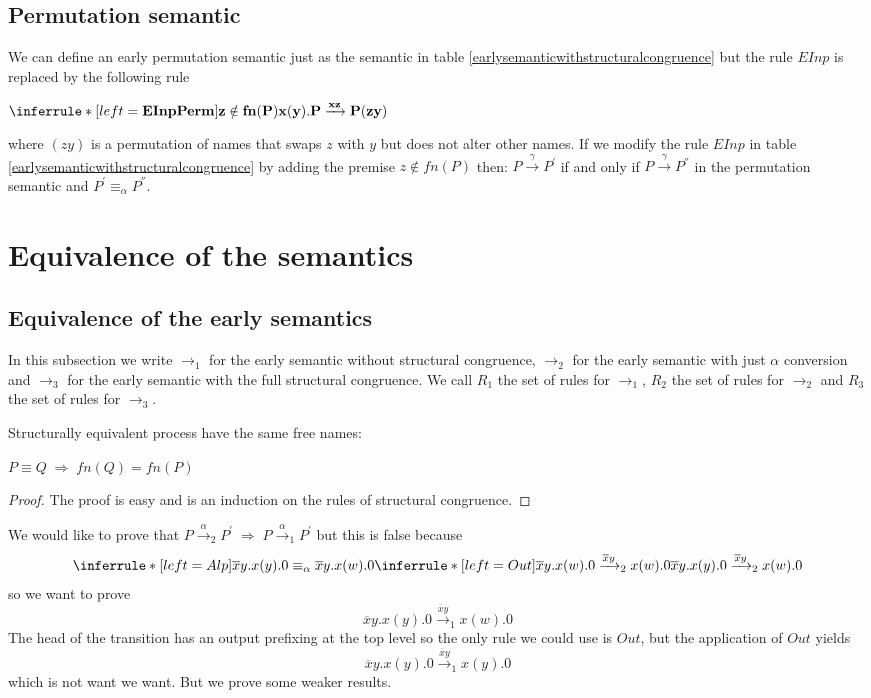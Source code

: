 \subsection{Permutation semantic}
We can define an early permutation semantic just as the semantic in table \ref{earlysemanticwithstructuralcongruence} but the rule $EInp$ is replaced by the following rule
\begin{center}
  $\inferrule* [left=\bf{EInpPerm}]{
    z\notin fn(P)
  }{
    x(y).P \xrightarrow{xz} P(zy)
  }$
\end{center}
where $(zy)$ is a permutation of names that swaps $z$ with $y$ but does not alter other names. If we modify the rule $EInp$ in table \ref{earlysemanticwithstructuralcongruence} by adding the premise $z\notin fn(P)$ then: $P\xrightarrow{\gamma}P^{'}$ if and only if $P\xrightarrow{\gamma}P^{''}$ in the permutation semantic and $P^{'}\equiv_{\alpha}P^{''}$.

\section{Equivalence of the semantics}
\subsection{Equivalence of the early semantics}\label{equivalenceOfEarlySemantics}
In this subsection we write $\rightarrow_{1}$ for the early semantic without structural congruence, $\rightarrow_{2}$ for the early semantic with just $\alpha$ conversion and $\rightarrow_{3}$ for the early semantic with the full structural congruence. We call $R_{1}$ the set of rules for $\rightarrow_{1}$, $R_{2}$ the set of rules for $\rightarrow_{2}$ and $R_{3}$ the set of rules for $\rightarrow_{3}$. 


\begin{lemma}
  Structurally equivalent process have the same free names:
  \begin{center}
    $P\equiv Q\; \Rightarrow\; fn(Q)= fn(P)$
  \end{center}
  \begin{proof}
    The proof is easy and is an induction on the rules of structural congruence.
  \end{proof}
\end{lemma}

We would like to prove that $P\xrightarrow{\alpha}_{2}P^{'}\; \Rightarrow\; P\xrightarrow{\alpha}_{1}P^{'}$ but this is false because
\[
  \inferrule* [left=Alp]{
      \overline{x}y.x(y).0 \equiv_{\alpha} \overline{x}y.x(w).0
    \\
      \inferrule* [left=Out]{
      }{
	\overline{x}y.x(w).0\xrightarrow{\overline{x}y}_{2}x(w).0
      }
  }{
    \overline{x}y.x(y).0\xrightarrow{\overline{x}y}_{2}x(w).0
  }
\]
so we want to prove 
\[
  \overline{x}y.x(y).0\xrightarrow{\overline{x}y}_{1}x(w).0
\] 
The head of the transition has an output prefixing at the top level so the only rule we could use is $Out$, but the application of $Out$ yields 
\[
  \overline{x}y.x(y).0\xrightarrow{\overline{x}y}_{1}x(y).0
\] 
which is not want we want. But we prove some weaker results.

